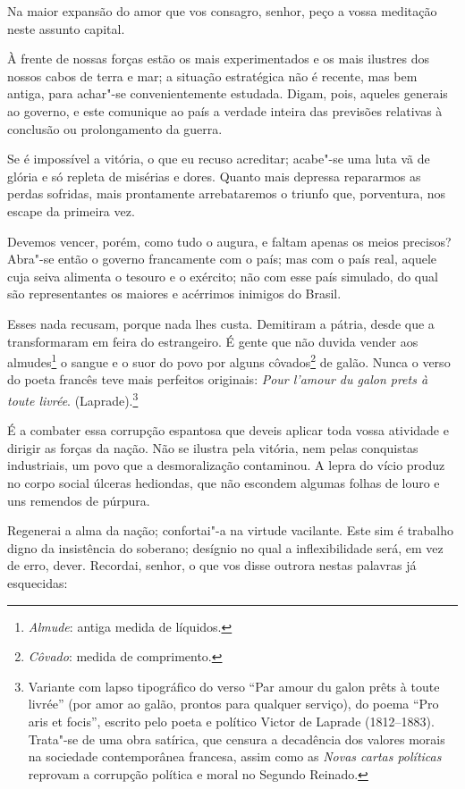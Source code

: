 \begin{linenumbers}

Na maior expansão do amor que vos consagro, senhor, peço a vossa
meditação neste assunto capital.

À frente de nossas forças estão os mais experimentados e os mais
ilustres dos nossos cabos de terra e mar; a situação estratégica não é
recente, mas bem antiga, para achar"-se convenientemente estudada.
Digam, pois, aqueles generais ao governo, e este comunique ao país a
verdade inteira das previsões relativas à conclusão ou prolongamento da guerra.

Se é impossível a vitória, o que eu recuso acreditar; acabe"-se uma
luta vã de glória e só repleta de misérias e dores. Quanto mais
depressa repararmos as perdas sofridas, mais prontamente arrebataremos
o triunfo que, porventura, nos escape da primeira vez. 

Devemos vencer, porém, como tudo o augura, e faltam apenas os meios
precisos? Abra"-se então o governo francamente com o país; mas com o
país real, aquele cuja seiva alimenta o tesouro e o exército; não com
esse país simulado, do qual são representantes os maiores e acérrimos
inimigos do Brasil.

Esses nada recusam, porque nada lhes custa. Demitiram a pátria, desde
que a transformaram em feira do estrangeiro. É gente que não duvida
vender aos almudes\footnote{ \textit{Almude}: antiga medida de líquidos.}
 o sangue e o suor do povo por alguns
côvados\footnote{ \textit{Côvado}: medida de comprimento.}
 de galão. Nunca o verso do poeta francês teve mais perfeitos originais:
\textit{Pour l'amour du galon prets à toute livrée}.
(Laprade).\footnote{ Variante com lapso tipográfico do verso ``Par amour du galon prêts à
toute livrée'' (por amor ao galão, prontos para qualquer serviço), do
poema ``Pro aris et focis'', escrito pelo poeta e político Victor de
Laprade (1812--1883). Trata"-se de uma obra satírica, que censura a
decadência dos valores morais na sociedade contemporânea francesa,
assim como as \textit{Novas cartas políticas} reprovam a corrupção política e
moral no Segundo Reinado.}

É a combater essa corrupção espantosa que deveis aplicar toda vossa
atividade e dirigir as forças da nação. Não se ilustra pela vitória,
nem pelas conquistas industriais, um povo que a desmoralização
contaminou. A lepra do vício produz no corpo social úlceras hediondas,
que não escondem algumas folhas de louro e uns remendos de púrpura. 

Regenerai a alma da nação; confortai"-a na virtude vacilante. Este sim
é trabalho digno da insistência do soberano; desígnio no qual a
inflexibilidade será, em vez de erro, dever. Recordai, senhor, o que
vos disse outrora nestas palavras já esquecidas:


\end{linenumbers}
